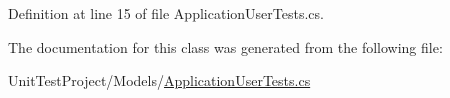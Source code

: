 Definition at line 15 of file Application\+User\+Tests.\+cs.



The documentation for this class was generated from the following file\+:\begin{DoxyCompactItemize}
\item 
Unit\+Test\+Project/\+Models/\mbox{\hyperlink{_application_user_tests_8cs}{Application\+User\+Tests.\+cs}}\end{DoxyCompactItemize}
